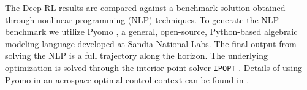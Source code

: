 \documentclass{UnderReview}
\begin{document}
The Deep RL results are compared against a benchmark solution obtained through nonlinear programming (NLP) techniques.  To generate the NLP benchmark we utilize Pyomo \cite{hart2017pyomo}, a general, open-source, Python-based algebraic modeling language developed at Sandia National Labs.  
The final output from solving the NLP is a full trajectory along the horizon. The underlying optimization is solved through the interior-point solver \verb|IPOPT| \cite{biegler2009large}.  Details of using Pyomo in an aerospace optimal control context can be found in \cite{schlossman2021open}.
\end{document}
